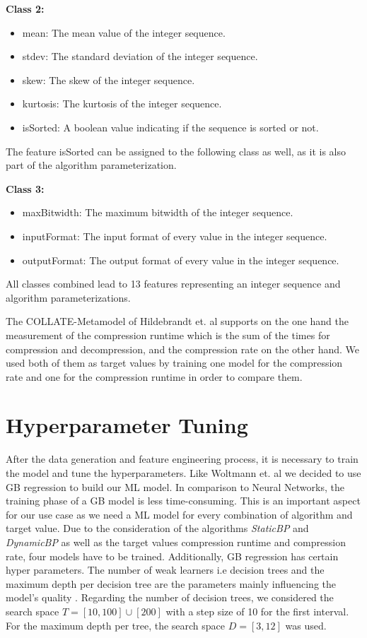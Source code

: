 \textbf{Class 2:}
\begin{itemize}[topsep=0pt]
    \itemsep0pt
    \item mean: The mean value of the integer sequence.
    \item stdev: The standard deviation of the integer sequence.
    \item skew: The skew of the integer sequence.
    \item kurtosis: The kurtosis of the integer sequence.
    \item isSorted: A boolean value indicating if the sequence is sorted or not.
\end{itemize}
The feature isSorted can be assigned to the following class as well, as it is also part of the algorithm parameterization.

\textbf{Class 3:}
\begin{itemize}[topsep=0pt]
    \itemsep0pt
    \item maxBitwidth: The maximum bitwidth of the integer sequence.
    \item inputFormat: The input format of every value in the integer sequence.
    \item outputFormat: The output format of every value in the integer sequence.
\end{itemize}
All classes combined lead to 13 features representing an integer sequence and algorithm parameterizations.

The COLLATE-Metamodel of Hildebrandt et. al \cite{Hildebrandt2017} supports on the one hand the measurement of the compression runtime which is the sum of the times for compression and decompression, and the compression rate on the other hand. We used both of them as target values by training one model for the compression rate and one for the compression runtime in order to compare them.

\section{Hyperparameter Tuning}
After the data generation and feature engineering process, it is necessary to train the model and tune the hyperparameters. Like Woltmann et. al \cite{Woltmann2021} we decided to use GB regression to build our ML model. In comparison to Neural Networks, the training phase of a GB model is less time-consuming. This is an important aspect for our use case as we need a ML model for every combination of algorithm and target value. Due to the consideration of the algorithms \emph{StaticBP} and \emph{DynamicBP} as well as the target values compression runtime and compression rate, four models have to be trained. Additionally, GB regression has certain hyper parameters. The number of weak learners i.e decision trees and the maximum depth per decision tree are the parameters mainly influencing the model's quality \cite{Woltmann2021}. Regarding the number of decision trees, we considered the search space \(T = [10,100] \cup{[200]}\) with a step size of 10 for the first interval. For the maximum depth per tree, the search space \(D = [3,12]\) was used.

